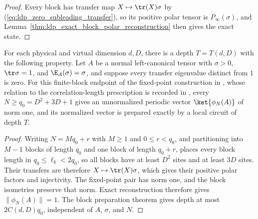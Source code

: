 \begin{proof}\leanok
    Every block has transfer map $X\mapsto\tr(X)\sigma$ by
    (\ref{eq:ldp_zero_subleading_transfer}), so its positive polar tensor
    is $P_\infty(\sigma)$, and
    Lemma~\ref{thm:ldp_exact_block_polar_reconstruction} then gives
    the exact state.
\end{proof}

\begin{lemma}
    \label{thm:ldp_zero_subleading_constant_depth}
    \leanok
    For each physical and virtual dimension $d,D$, there is a depth
    $T=T(d,D)$ with the following property. Let $A$ be a normal
    left-canonical tensor with $\sigma>0$, $\tr\sigma=1$, and
    $\E_A(\sigma)=\sigma$, and suppose every transfer eigenvalue
    distinct from $1$ is zero. For this finite-block endpoint of the
    fixed-point construction in \cite{Malz2024Preparation}, whose
    relation to the correlation-length prescription is recorded in
    \cite{gap:mswc24_zero_subleading_spectrum_endpoint}, every
    $N\geq q_0=D^2+3D+1$ gives an unnormalized periodic vector
    $\ket{\phi_N(A)}$ of norm one, and its normalized vector is
    prepared exactly by a local circuit of depth $T$.
\end{lemma}

\begin{proof}\leanok
    Writing $N=Mq_0+r$ with $M\geq1$ and $0\leq r<q_0$, and partitioning
    into $M-1$ blocks of length $q_0$ and one block of length
    $q_0+r$, places every block length in $q_0\leq\ell_k<2q_0$, so all blocks have at least
    $D^2$ sites and at least $3D$ sites. Their transfers are therefore
    $X\mapsto\tr(X)\sigma$, which gives their positive polar factors
    and injectivity. The fixed-point pair has norm one, and the block
    isometries preserve that norm. Exact reconstruction therefore gives
    $\|\phi_N(A)\|=1$. The block preparation theorem gives depth at most
    $2C(d,D)q_0$, independent of $A$, $\sigma$, and $N$.
\end{proof}
